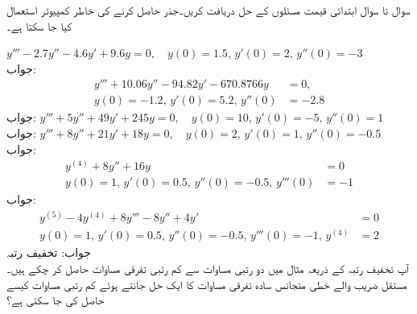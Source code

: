 سوال  تا سوال  ابتدائی قیمت مسئلوں کے حل دریافت کریں۔جذر حاصل کرنے کی خاطر کمپیوٹر استعمال کیا جا سکتا ہے۔

\quad
$y'''-2.7y''-4.6y'+9.6y=0,\quad y(0)=1.5, \,y'(0)=2, \, y''(0)=-3$\\
جواب:
\begin{align*}
y'''+10.06y''-94.82y'-670.8766y&=0,\\
 y(0)=-1.2,\, y'(0)=5.2, \, y''(0)&=-2.8
\end{align*}
جواب:
\quad
$y'''+5y''+49y'+245y=0,\quad y(0)=10, \,y'(0)=-5, \, y''(0)=1$\\
جواب:
\quad
$y'''+8y''+21y'+18y=0,\quad y(0)=2, \,y'(0)=1, \, y''(0)=-0.5$\\
جواب:
\begin{align*}
y^{(4)}+8y''+16y&=0 \\
y(0)=1, \,y'(0)=0.5, \, y''(0)=-0.5,\, y'''(0)&=-1
\end{align*}
جواب:
\begin{align*}
y^{(5)}-4y^{(4)}+8y'''-8y''+4y'&=0 \\
y(0)=1, \,y'(0)=0.5, \, y''(0)=-0.5,\, y'''(0)=-1, \, y^{(4)}&=2
\end{align*}
جواب:
\quad تخفیف رتبہ\\
آپ تخفیف رتبہ کے ذریعہ مثال  میں دو رتبی مساوات سے  کم رتبی تفرقی مساوات حاصل کر چکے ہیں۔ مستقل  ضریب  والے خطی متجانس سادہ تفرقی مساوات کا ایک حل  جانتے ہوئے کم رتبی مساوات کیسے حاصل کی جا سکتی ہے؟

